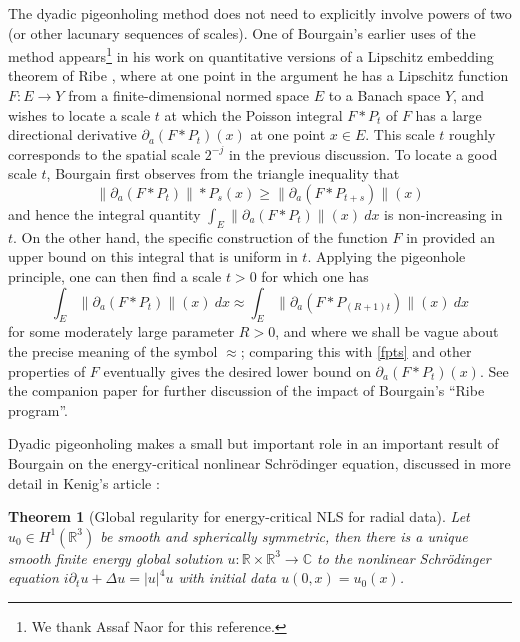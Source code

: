 \documentclass[12pt,a4paper,reqno]{amsart}
\numberwithin{equation}{section}
\theoremstyle{plain}
\newtheorem{theorem}{Theorem}[section]
\theoremstyle{definition}
\newcommand\R{\mathbb{R}}
\newcommand\C{\mathbb{C}}
\begin{document}
The dyadic pigeonholing method does not need to explicitly involve powers of two (or other lacunary sequences of scales).  One of Bourgain's earlier uses of the method appears\footnote{We thank Assaf Naor for this reference.} in his work \cite[\S 5]{lipschitz} on quantitative versions of a Lipschitz embedding theorem of Ribe \cite{ribe}, where at one point in the argument he has a Lipschitz function $F: E \to Y$ from a finite-dimensional normed space $E$ to a Banach space $Y$, and wishes to locate a scale $t$ at which the Poisson integral $F * P_t$ of $F$ has a large directional derivative $\partial_a(F*P_t)(x)$ at one point $x \in E$.  This scale $t$ roughly corresponds to the spatial scale $2^{-j}$ in the previous discussion.  To locate a good scale $t$, Bourgain first observes from the triangle inequality that
\begin{equation}\label{fpts}
 \|\partial_a(F*P_t)\| * P_s(x) \geq \| \partial_a(F * P_{t+s}) \|(x)
\end{equation}
and hence the integral quantity $\int_E \|\partial_a(F*P_t)\|(x)\ dx$ is non-increasing in $t$.  On the other hand, the specific construction of the function $F$ in \cite{lipschitz} provided an upper bound on this integral that is uniform in $t$.  Applying the pigeonhole principle, one can then find a scale $t>0$ for which one has
$$\int_E \|\partial_a(F*P_t)\|(x)\ dx \approx \int_E \|\partial_a(F*P_{(R+1)t})\|(x)\ dx$$
for some moderately large parameter $R>0$, and where we shall be vague about the precise meaning of the symbol $\approx$; comparing this with \eqref{fpts} and other properties of $F$ eventually gives the desired lower bound on $\partial_a(F*P_t)(x)$.  See the companion paper \cite{ball} for further discussion of the impact of Bourgain's ``Ribe program''.

Dyadic pigeonholing makes a small but important role in an important result \cite{nls} of Bourgain on the energy-critical nonlinear Schr\"odinger equation, discussed in more detail in Kenig's article \cite{kenig}:

\begin{theorem}[Global regularity for energy-critical NLS for radial data]  Let $u_0 \in H^1(\R^3)$ be smooth and spherically symmetric, then there is a unique smooth finite energy global solution $u: \R \times \R^3 \to \C$ to the nonlinear Schr\"odinger equation $i \partial_t u + \Delta u = |u|^4 u$ with initial data $u(0,x) = u_0(x)$.
\end{theorem}
\end{document}
